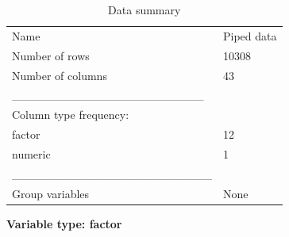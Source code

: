 \documentclass[
  letterpaper,
  DIV=11,
  numbers=noendperiod,
  oneside]{scrreprt}
\begin{document}
\begin{longtable}[]{@{}ll@{}}
\caption{Data summary}\tabularnewline
\toprule()
\endhead
Name & Piped data \\
Number of rows & 10308 \\
Number of columns & 43 \\
\_\_\_\_\_\_\_\_\_\_\_\_\_\_\_\_\_\_\_\_\_\_\_ & \\
Column type frequency: & \\
factor & 12 \\
numeric & 1 \\
\_\_\_\_\_\_\_\_\_\_\_\_\_\_\_\_\_\_\_\_\_\_\_\_ & \\
Group variables & None \\
\bottomrule()
\end{longtable}

\textbf{Variable type: factor}
\end{document}
